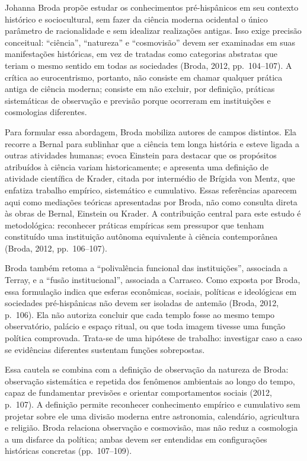 \documentclass[
  brazilian,
]{article}
\begin{document}
Johanna Broda propõe estudar os conhecimentos pré-hispânicos em seu
contexto histórico e sociocultural, sem fazer da ciência moderna
ocidental o único parâmetro de racionalidade e sem idealizar realizações
antigas. Isso exige precisão conceitual: ``ciência'', ``natureza'' e
``cosmovisão'' devem ser examinadas em suas manifestações históricas, em
vez de tratadas como categorias abstratas que teriam o mesmo sentido em
todas as sociedades (Broda, 2012, pp.~104--107). A crítica ao
eurocentrismo, portanto, não consiste em chamar qualquer prática antiga
de ciência moderna; consiste em não excluir, por definição, práticas
sistemáticas de observação e previsão porque ocorreram em instituições e
cosmologias diferentes.

Para formular essa abordagem, Broda mobiliza autores de campos
distintos. Ela recorre a Bernal para sublinhar que a ciência tem longa
história e esteve ligada a outras atividades humanas; evoca Einstein
para destacar que os propósitos atribuídos à ciência variam
historicamente; e apresenta uma definição de atividade científica de
Krader, citada por intermédio de Brígida von Mentz, que enfatiza
trabalho empírico, sistemático e cumulativo. Essas referências aparecem
aqui como mediações teóricas apresentadas por Broda, não como consulta
direta às obras de Bernal, Einstein ou Krader. A contribuição central
para este estudo é metodológica: reconhecer práticas empíricas sem
pressupor que tenham constituído uma instituição autônoma equivalente à
ciência contemporânea (Broda, 2012, pp.~106--107).

Broda também retoma a ``polivalência funcional das instituições'',
associada a Terray, e a ``fusão institucional'', associada a Carrasco.
Como exposta por Broda, essa formulação indica que esferas econômicas,
sociais, políticas e ideológicas em sociedades pré-hispânicas não devem
ser isoladas de antemão (Broda, 2012, p.~106). Ela não autoriza concluir
que cada templo fosse ao mesmo tempo observatório, palácio e espaço
ritual, ou que toda imagem tivesse uma função política comprovada.
Trata-se de uma hipótese de trabalho: investigar caso a caso se
evidências diferentes sustentam funções sobrepostas.

Essa cautela se combina com a definição de observação da natureza de
Broda: observação sistemática e repetida dos fenômenos ambientais ao
longo do tempo, capaz de fundamentar previsões e orientar comportamentos
sociais (2012, p.~107). A definição permite reconhecer conhecimento
empírico e cumulativo sem projetar sobre ele uma divisão moderna entre
astronomia, calendário, agricultura e religião. Broda relaciona
observação e cosmovisão, mas não reduz a cosmologia a um disfarce da
política; ambas devem ser entendidas em configurações históricas
concretas (pp.~107--109).
\end{document}
